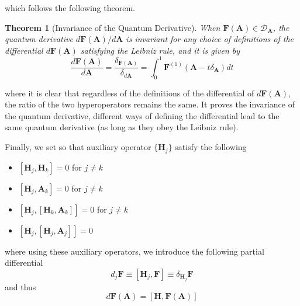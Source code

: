 \documentclass[a4paper]{article}
\newtheorem{theorem}{Theorem}[section]
\theoremstyle{definition}
\begin{document}
which follows the following theorem.
\begin{theorem}[Invariance of the Quantum Derivative]
	When $\textbf{F}(\textbf{A})\in\mathcal{D}_\textbf{A}$, the quantum derivative $d\textbf{F}(\textbf{A})/d\textbf{A}$ is invariant for any choice of definitions of the diﬀerential $d\textbf{F}(\textbf{A})$ satisfying the Leibniz rule, and it is given by
	\begin{equation}
		\frac{d\textbf{F}(\textbf{A})}{d\textbf{A}}=\frac{\delta_{\textbf{F}(\textbf{A})}}{\delta_{d\textbf{A}}}=\int_0^1\textbf{F}^{(1)}(\textbf{A}-t\delta_\textbf{A})dt
	\end{equation}
\end{theorem}
where it is clear that regardless of the definitions of the differential of $d\textbf{F}(\textbf{A})$, the ratio of the two hyperoperators remains the same. It proves the invariance of the quantum derivative, different ways of defining the differential lead to the same quantum derivative (as long as they obey the Leibniz rule).

Finally, we set so that auxiliary operator $\{\textbf{H}_j\}$ satisfy the following
\begin{itemize}
	\item $[\textbf{H}_j,\textbf{H}_k]=0$ for $j\neq k$
	\item $[\textbf{H}_j,\textbf{A}_k]=0$ for $j\neq k$
	\item $[\textbf{H}_j,[\textbf{H}_k,\textbf{A}_k]]=0$ for $j\neq k$
	\item $[\textbf{H}_j,[\textbf{H}_j,\textbf{A}_j]]=0$
\end{itemize}
where using these auxiliary operators, we introduce the following partial differential
\begin{equation}
	d_j\textbf{F}\equiv[\textbf{H}_j,\textbf{F}]\equiv\delta_{\textbf{H}_j}\textbf{F}
\end{equation}
and thus
\begin{equation}
	d\textbf{F}(\textbf{A})=[\textbf{H},\textbf{F}(\textbf{A})]
\end{equation}
\end{document}
